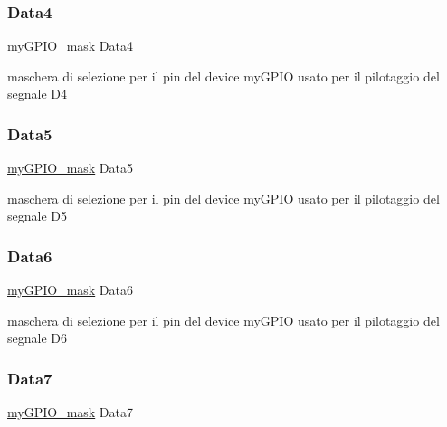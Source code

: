 \subsubsection{\texorpdfstring{Data4}{Data4}}
{\footnotesize\ttfamily \hyperlink{group__bare-metal_ga402a0d20afc0cb7c25554b8b023f4253}{my\+G\+P\+I\+O\+\_\+mask} Data4}

maschera di selezione per il pin del device my\+G\+P\+IO usato per il pilotaggio del segnale D4 \mbox{\label{struct_h_d44780___l_c_d__t_abebc68d092e3d1c115ecb22f7ac91f4b}} 
\subsubsection{\texorpdfstring{Data5}{Data5}}
{\footnotesize\ttfamily \hyperlink{group__bare-metal_ga402a0d20afc0cb7c25554b8b023f4253}{my\+G\+P\+I\+O\+\_\+mask} Data5}

maschera di selezione per il pin del device my\+G\+P\+IO usato per il pilotaggio del segnale D5 \mbox{\label{struct_h_d44780___l_c_d__t_aab366da5e8192bd7c5dd9194aa2d6fde}} 
\subsubsection{\texorpdfstring{Data6}{Data6}}
{\footnotesize\ttfamily \hyperlink{group__bare-metal_ga402a0d20afc0cb7c25554b8b023f4253}{my\+G\+P\+I\+O\+\_\+mask} Data6}

maschera di selezione per il pin del device my\+G\+P\+IO usato per il pilotaggio del segnale D6 \mbox{\label{struct_h_d44780___l_c_d__t_a0709183e63889cacaf3149c60ff6cb7d}} 
\subsubsection{\texorpdfstring{Data7}{Data7}}
{\footnotesize\ttfamily \hyperlink{group__bare-metal_ga402a0d20afc0cb7c25554b8b023f4253}{my\+G\+P\+I\+O\+\_\+mask} Data7}

